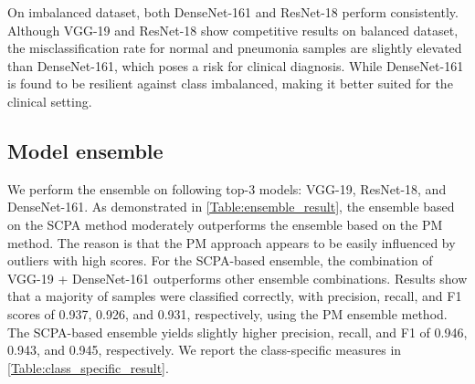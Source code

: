 \documentclass[conference]{IEEEtran}
\begin{document}
On imbalanced dataset, both DenseNet-161 and ResNet-18 perform consistently. Although VGG-19 and ResNet-18 show competitive results on balanced dataset, the misclassification rate for normal and pneumonia samples are slightly elevated than DenseNet-161, which poses a risk for clinical diagnosis. 
While DenseNet-161 is found to be resilient against class imbalanced, making it better suited for the clinical setting. %

\subsection{Model ensemble}
\label{model_ensemble}
We perform the ensemble on following top-3 models: VGG-19, ResNet-18, and DenseNet-161. %
As demonstrated in \cref{Table:ensemble_result}, the ensemble based on the SCPA method moderately outperforms the ensemble based on the PM method. The reason is that the PM approach appears to be easily influenced by outliers with high scores. %
For the SCPA-based ensemble, the combination of VGG-19 + DenseNet-161 outperforms other ensemble combinations. Results show that a majority of samples were classified correctly, with precision, recall, and F1 scores of 0.937, 0.926, and 0.931, respectively, using the PM ensemble method.
The SCPA-based ensemble yields slightly higher precision, recall, and F1 of 0.946, 0.943, and 0.945, respectively. We report the class-specific measures in \cref{Table:class_specific_result}. %
\end{document}
